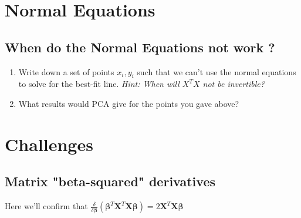 \documentclass[11pt]{article}
\newcommand\xmtx{\boldsymbol{X}}
\newcommand\betavec{\boldsymbol{\beta}}
\begin{document}

\section { Normal Equations }

\subsection{ When do the Normal Equations not work ? }

\begin{enumerate}
    \item Write down a set of points $x_i, y_i$ such that we can't use
        the normal equations to solve for the best-fit line. \emph{ Hint: When
        will $X^TX$ not be invertible?} 
    \item What results would PCA give for the points you gave above?
\end{enumerate}
\section {Challenges}

\subsection{ Matrix "beta-squared" derivatives }

Here we'll confirm that $\frac{ \delta }{ \delta \betavec } ( \betavec^T \xmtx^T \xmtx \betavec )
    = 2 \xmtx^T \xmtx \betavec $
\end{document}
